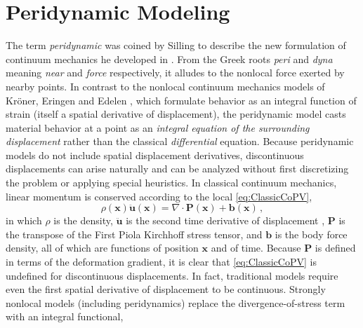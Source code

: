 \section{Peridynamic Modeling}
The term \textit{peridynamic} was coined by Silling to describe the new formulation of continuum mechanics he developed in \cite{silling2000reformulation}.
From the Greek roots \textit{peri} and \textit{dyna} meaning \textit{near} and \textit{force} respectively, it alludes to the nonlocal force exerted by nearby points.
In contrast to the nonlocal continuum mechanics models of Kr\"oner, Eringen and Edelen \cite{kroner1967elasticity,eringen1972nonlocal,eringen1983differential}, which formulate behavior as an integral function of strain (itself a spatial derivative of displacement), the peridynamic model casts material behavior at a point as an \textit{integral equation of the surrounding displacement} rather than the classical \textit{differential} equation.
Because peridynamic models do not include spatial displacement derivatives, discontinuous displacements can arise naturally and can be analyzed without first discretizing the problem or applying special heuristics.
In classical continuum mechanics, linear momentum is conserved according to the local  \cref{eq:ClassicCoPV},
%
\begin{equation}
\label{eq:ClassicCoPV}
\rho(\mathbf{x})\ddot{\mathbf{u}}(\mathbf{x}) = \nabla \cdot \mathbf{P}(\mathbf{x}) + \mathbf{b}(\mathbf{x})\, ,
\end{equation}
%
in which $\rho$ is the density, $\ddot{\mathbf{u}}$ is the second time derivative of displacement , $\mathbf{P}$ is the transpose of the First Piola Kirchhoff stress tensor, and $\mathbf{b}$ is the body force density, all of which are functions of position $\mathbf{x}$ and of time. 
Because \(\mathbf{P}\) is defined in terms of the deformation gradient, it is clear that \cref{eq:ClassicCoPV} is undefined for discontinuous displacements. 
In fact, traditional models require even the first spatial derivative of displacement to be continuous.
Strongly nonlocal models (including peridynamics) replace the divergence-of-stress term with an integral functional,
